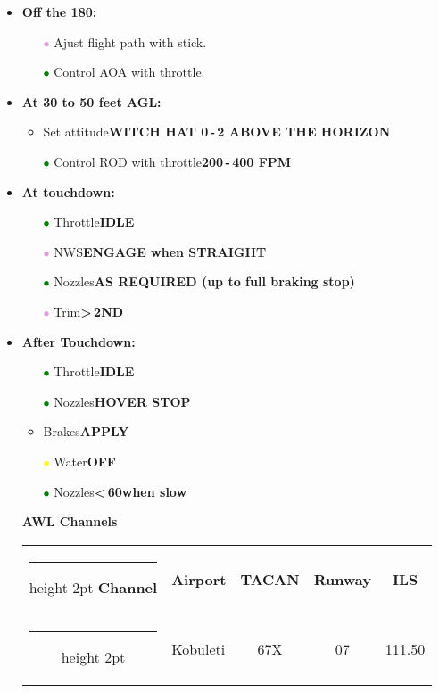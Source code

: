 \documentclass[a4paper,12pt,dvipsnames]{letter}
\makeatletter
\newcommand{\thickhline}{\noalign {\ifnum 0=`}\fi \hrule height 2pt \futurelet \reserved@a \@xhline}
\newcommand{\button}[1]{\textbf{#1}}
\newcommand{\Deg}{\textdegree{}}
\newcommand{\gi}{\textcolor{Green}{$\bullet$\;}}
\newcommand{\yi}{\textcolor{Yellow}{$\bullet$\;}}
\newcommand{\vi}{\textcolor{Plum}{$\bullet$\;}}
\newcommand{\tb}[1]{\textbf{#1}}
\makeatother
\begin{document}
{\begin{itemize}
\begin{itemize}
\end{itemize}
\item \button{Off the 180:}
\begin{itemize}
 \item[\vi] Ajust flight path with stick.
 \item[\gi] Control AOA with throttle.
\end{itemize}
\item \button{At 30 to 50 feet AGL:}
\begin{itemize}
 \item Set attitude\dotfill\button{WITCH HAT 0\Deg\,-\,2\Deg{} ABOVE THE HORIZON}
 \item[\gi] Control ROD with throttle\dotfill\button{200\,-\,400 FPM}
\end{itemize}
\item \button{At touchdown:}
\begin{itemize}
 \item[\gi] Throttle\dotfill\button{IDLE}
 \item[\vi] NWS\dotfill\button{ENGAGE when STRAIGHT}
 \item[\gi] Nozzles\dotfill\button{AS REQUIRED (up to full braking stop)}
 \item[\vi] Trim\dotfill\button{>\,2\Deg\;ND}
\end{itemize}
\item \button{After Touchdown:}
\begin{itemize}
\item[\gi] Throttle\dotfill\button{IDLE}
\item[\gi] Nozzles\dotfill\button{HOVER STOP}
\item Brakes\dotfill\button{APPLY}
\item[\yi] Water\dotfill\button{OFF}
\item[\gi] Nozzles\dotfill\button{<\,60\Deg\;when slow}
\end{itemize}
\end{itemize}
\newpage
\begin{itemize}
\item[] {\LARGE\textbf{AWL Channels}}
\item[]
 \item[]
%
\begin{tabular}{c|l|c|c|c}
\thickhline
 \tb{Channel} & \tb{Airport}                 & \tb{TACAN}  & \tb{Runway} & \tb{ILS}  \\ \thickhline
 1            & Kobuleti                     & 67X         & 07          & 111.50    \\ \hline

\end{tabular}
\end{itemize}}
\end{document}
